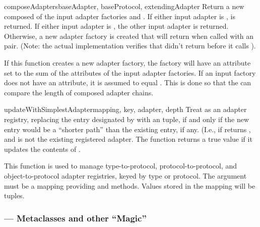 \begin{verbatim%
}
\begin{verbatim%
}
\begin{verbatim%
}
\begin{verbatim%
}
\begin{verbatim%
}
\begin{verbatim%
}
\begin{funcdesc}{composeAdapters}{baseAdapter, baseProtocol, extendingAdapter}
Return a new  composed of the input adapter factories
 and .  If either input adapter is
,  is returned.  If
either input adapter is , the other input adapter
is returned.  Otherwise, a new adapter factory is created that will return
when called with an  pair.  (Note: the actual
implementation verifies that  didn't return 
before it calls ).

If this function creates a new adapter factory, the factory will have an
 attribute set to the sum of the
 attributes of the input adapter factories.  If an
input factory does not have an  attribute, it is
assumed to equal .  This is done so that the
 can compare the length of composed adapter chains.
\end{funcdesc}


\begin{funcdesc}{updateWithSimplestAdapter}{mapping, key, adapter, depth}
Treat  as an adapter registry, replacing the entry designated by
 with an  tuple, if and only if
the new entry would be a ``shorter path'' than the existing entry, if any.
(I.e., if 
returns , and  is not the existing registered
adapter.  The function returns a true value if it updates the contents of
.

This function is used to manage type-to-protocol, protocol-to-protocol, and
object-to-protocol adapter registries, keyed by type or protocol.  The
 argument must be a mapping providing 
and  methods.  Values stored in the mapping will be
 tuples.
\end{funcdesc}






\subsubsection{ --- Metaclasses and other ``Magic''}


\end{verbatim%
}
\end{verbatim%
}
\end{verbatim%
}
\end{verbatim%
}
\end{verbatim%
}
\end{verbatim%
}
